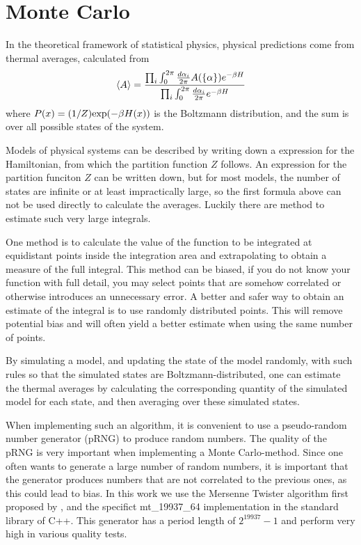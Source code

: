 %

\section{Monte Carlo}
In the theoretical framework of statistical physics, physical predictions come from thermal averages, calculated from 
\begin{equation}
  \langle A \rangle =\frac{\prod_{i}\int_{0}^{2\pi}\frac{d \alpha_i}{2\pi} A(\{\alpha\})e^{-\beta H}}{\prod_{i}\int_{0}^{2\pi}\frac{d \alpha_i}{2\pi} e^{-\beta H}}
  \label{}
\end{equation}
where  $P(x) = (1/Z)\textrm{exp}(- \beta H(x))$ is the Boltzmann distribution, and the sum is over all possible states of the system. 

Models of physical systems can be described by writing down a expression for the Hamiltonian, from which the partition function $Z$ follows.
An expression for the partition funciton $Z$ can be written down, but for most models, the number of states are infinite or at least impractically large, so the first formula above can not be used directly to calculate the averages.
Luckily there are method to estimate such very large integrals.

One method is to calculate the value of the function to be integrated at equidistant points inside the integration area and extrapolating to obtain a measure of the full integral.
This method can be biased, if you do not know your function with full detail, you may select points that are somehow correlated or otherwise introduces an unnecessary error.
A better and safer way to obtain an estimate of the integral is to use randomly distributed points.
This will remove potential bias and will often yield a better estimate when using the same number of points.

By simulating a model, and updating the state of the model randomly, with such rules so that the simulated states are Boltzmann-distributed, one can estimate the thermal averages by calculating the corresponding quantity of the simulated model for each state, and then averaging over these simulated states. 

When implementing such an algorithm, it is convenient to use a pseudo-random number generator (pRNG) to produce random numbers.
The quality of the pRNG is very important when implementing a Monte Carlo-method.
Since one often wants to generate a large number of random numbers, it is important that the generator produces numbers that are not correlated to the previous ones, as this could lead to bias. 
In this work we use the Mersenne Twister algorithm first proposed by \cite{Matsumoto1998}, and the specifict  mt\_19937\_64  implementation in the standard library of C++.
This generator has a period length of $2^{19937}-1$ and perform very high in various quality tests.


